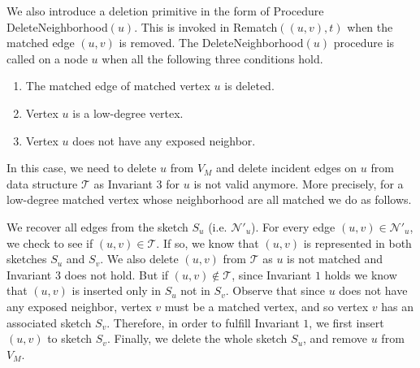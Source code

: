 \documentclass[11pt,letter]{article}
\begin{document}
\begin{center}
\end{center}





We also introduce a deletion primitive in the form of Procedure {\sf
  DeleteNeighborhood$(u)$}.  This is
invoked in {\sf Rematch$((u,v), t)$} when
the matched edge $(u,v)$ is removed. 
The {\sf DeleteNeighborhood$(u)$} procedure is called on a node $u$ when 
all the following three conditions hold.
\begin{enumerate}
 \item The matched edge of matched vertex $u$ is deleted.
 \item Vertex $u$ is a low-degree vertex.
 \item Vertex  $u$ does not have any exposed neighbor.
\end{enumerate}

In this case, we need to delete $u$ from $V_M$ and delete incident edges on
$u$ from data structure $\mathcal{T}$ as Invariant $3$ for $u$ is not valid
anymore. More precisely, for a low-degree matched vertex whose neighborhood
are all matched we do as follows.

We recover all edges from the sketch $S_u$ (i.e. $\mathcal{N}'_u$).
For every edge $(u,v) \in \mathcal{N}'_u$,
we check to see if $(u,v)\in\mathcal{T}$.
If so, we know that $(u,v)$
is represented in both sketches $S_u$ and $S_v$.
We also delete $(u,v)$ from $\mathcal{T}$ as $u$ is not
matched and Invariant $3$ does not hold.
But if $(u,v)\notin\mathcal{T}$,
since Invariant $1$ holds we know that $(u,v)$ is inserted only in $S_u$ not in $S_v$.
Observe that since $u$ does not have
any exposed neighbor, vertex $v$ must be a matched vertex, and so
vertex $v$ has an associated sketch $S_v$.
Therefore, in order to fulfill Invariant $1$, we first insert $(u,v)$ to sketch $S_v$.
Finally, we delete the whole sketch $S_u$,
and remove $u$ from $V_M$.
\end{document}

